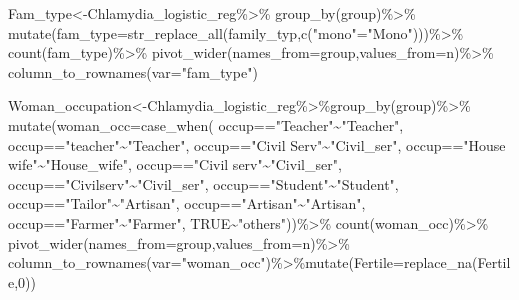 \documentclass[
]{article}
\newenvironment{Shaded}{\begin{snugshade}}{\end{snugshade}}
\newcommand{\AttributeTok}[1]{\textcolor[rgb]{0.77,0.63,0.00}{#1}}
\newcommand{\ConstantTok}[1]{\textcolor[rgb]{0.00,0.00,0.00}{#1}}
\newcommand{\DecValTok}[1]{\textcolor[rgb]{0.00,0.00,0.81}{#1}}
\newcommand{\FunctionTok}[1]{\textcolor[rgb]{0.00,0.00,0.00}{#1}}
\newcommand{\NormalTok}[1]{#1}
\newcommand{\OtherTok}[1]{\textcolor[rgb]{0.56,0.35,0.01}{#1}}
\newcommand{\SpecialCharTok}[1]{\textcolor[rgb]{0.00,0.00,0.00}{#1}}
\newcommand{\StringTok}[1]{\textcolor[rgb]{0.31,0.60,0.02}{#1}}
\begin{document}
\begin{Shaded}
\begin{Highlighting}[]
\NormalTok{Fam\_type}\OtherTok{\textless{}{-}}\NormalTok{Chlamydia\_logistic\_reg}\SpecialCharTok{\%\textgreater{}\%}
  \FunctionTok{group\_by}\NormalTok{(group)}\SpecialCharTok{\%\textgreater{}\%}
  \FunctionTok{mutate}\NormalTok{(}\AttributeTok{fam\_type=}\FunctionTok{str\_replace\_all}\NormalTok{(family\_typ,}\FunctionTok{c}\NormalTok{(}\StringTok{"mono"}\OtherTok{=}\StringTok{"Mono"}\NormalTok{)))}\SpecialCharTok{\%\textgreater{}\%}
  \FunctionTok{count}\NormalTok{(fam\_type)}\SpecialCharTok{\%\textgreater{}\%}
  \FunctionTok{pivot\_wider}\NormalTok{(}\AttributeTok{names\_from=}\NormalTok{group,}\AttributeTok{values\_from=}\NormalTok{n)}\SpecialCharTok{\%\textgreater{}\%}
  \FunctionTok{column\_to\_rownames}\NormalTok{(}\AttributeTok{var=}\StringTok{"fam\_type"}\NormalTok{)}

\NormalTok{Woman\_occupation}\OtherTok{\textless{}{-}}\NormalTok{Chlamydia\_logistic\_reg}\SpecialCharTok{\%\textgreater{}\%}\FunctionTok{group\_by}\NormalTok{(group)}\SpecialCharTok{\%\textgreater{}\%}
  \FunctionTok{mutate}\NormalTok{(}\AttributeTok{woman\_occ=}\FunctionTok{case\_when}\NormalTok{(}
\NormalTok{    occup}\SpecialCharTok{==}\StringTok{"Teacher"}\SpecialCharTok{\textasciitilde{}}\StringTok{"Teacher"}\NormalTok{,}
\NormalTok{    occup}\SpecialCharTok{==}\StringTok{"teacher"}\SpecialCharTok{\textasciitilde{}}\StringTok{"Teacher"}\NormalTok{,}
\NormalTok{    occup}\SpecialCharTok{==}\StringTok{"Civil Serv"}\SpecialCharTok{\textasciitilde{}}\StringTok{"Civil\_ser"}\NormalTok{,}
\NormalTok{    occup}\SpecialCharTok{==}\StringTok{"House wife"}\SpecialCharTok{\textasciitilde{}}\StringTok{"House\_wife"}\NormalTok{,}
\NormalTok{    occup}\SpecialCharTok{==}\StringTok{"Civil serv"}\SpecialCharTok{\textasciitilde{}}\StringTok{"Civil\_ser"}\NormalTok{, }
\NormalTok{    occup}\SpecialCharTok{==}\StringTok{"Civilserv"}\SpecialCharTok{\textasciitilde{}}\StringTok{"Civil\_ser"}\NormalTok{,}
\NormalTok{    occup}\SpecialCharTok{==}\StringTok{"Student"}\SpecialCharTok{\textasciitilde{}}\StringTok{"Student"}\NormalTok{,}
\NormalTok{    occup}\SpecialCharTok{==}\StringTok{"Tailor"}\SpecialCharTok{\textasciitilde{}}\StringTok{"Artisan"}\NormalTok{,}
\NormalTok{    occup}\SpecialCharTok{==}\StringTok{"Artisan"}\SpecialCharTok{\textasciitilde{}}\StringTok{"Artisan"}\NormalTok{, }
\NormalTok{    occup}\SpecialCharTok{==}\StringTok{"Farmer"}\SpecialCharTok{\textasciitilde{}}\StringTok{"Farmer"}\NormalTok{,}
    \ConstantTok{TRUE}\SpecialCharTok{\textasciitilde{}}\StringTok{"others"}\NormalTok{))}\SpecialCharTok{\%\textgreater{}\%}
  \FunctionTok{count}\NormalTok{(woman\_occ)}\SpecialCharTok{\%\textgreater{}\%}
  \FunctionTok{pivot\_wider}\NormalTok{(}\AttributeTok{names\_from=}\NormalTok{group,}\AttributeTok{values\_from=}\NormalTok{n)}\SpecialCharTok{\%\textgreater{}\%}
  \FunctionTok{column\_to\_rownames}\NormalTok{(}\AttributeTok{var=}\StringTok{"woman\_occ"}\NormalTok{)}\SpecialCharTok{\%\textgreater{}\%}\FunctionTok{mutate}\NormalTok{(}\AttributeTok{Fertile=}\FunctionTok{replace\_na}\NormalTok{(Fertile,}\DecValTok{0}\NormalTok{))}


\end{Highlighting}
\end{Shaded}
\end{document}
